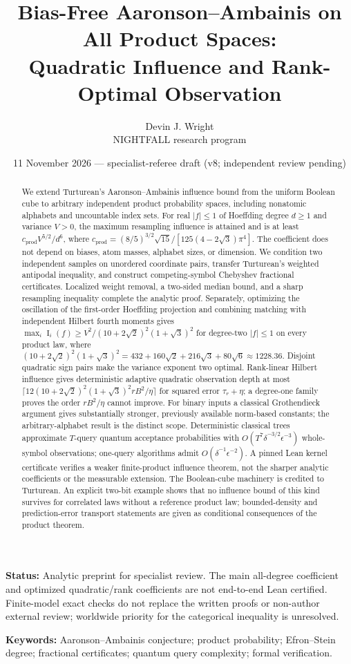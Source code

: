 \documentclass[11pt]{article}
\title{Bias-Free Aaronson--Ambainis on All Product Spaces:\\[2pt]\large Quadratic Influence and Rank-Optimal Observation}
\author{Devin J. Wright\\\small NIGHTFALL research program}
\date{11 November 2026 --- specialist-referee draft (v8; independent review pending)}
\numberwithin{equation}{section}
\theoremstyle{remark}
\newcommand{\Inf}{\operatorname{I}}
\newcommand{\cprod}{c_{\mathrm{prod}}}
\newcommand{\Kquad}{(10+2\sqrt2)^2(1+\sqrt3)^2}
\begin{document}
\maketitle
\begin{abstract}
We extend Turturean's Aaronson--Ambainis influence bound from the uniform Boolean cube to arbitrary independent product probability spaces, including nonatomic alphabets and uncountable index sets. For real $|f|\le1$ of Hoeffding degree $d\ge1$ and variance $V>0$, the maximum resampling influence is attained and is at least $\cprod V^{5/2}/d^6$, where $\cprod=(8/5)^{3/2}\sqrt{15}/[125(4-2\sqrt3)\pi^4]$. The coefficient does not depend on biases, atom masses, alphabet sizes, or dimension. We condition two independent samples on unordered coordinate pairs, transfer Turturean's weighted antipodal inequality, and construct competing-symbol Chebyshev fractional certificates. Localized weight removal, a two-sided median bound, and a sharp resampling inequality complete the analytic proof. Separately, optimizing the oscillation of the first-order Hoeffding projection and combining matching with independent Hilbert fourth moments gives $\max_i\Inf_i(f)\ge V^2/\Kquad$ for degree-two $|f|\le1$ on every product law, where $\Kquad=432+160\sqrt2+216\sqrt3+80\sqrt6\approx1228.36$. Disjoint quadratic sign pairs make the variance exponent two optimal. Rank-linear Hilbert influence gives deterministic adaptive quadratic observation depth at most $\lceil12\Kquad rB^2/\eta\rceil$ for squared error $\tau_r+\eta$; a degree-one family proves the order $rB^2/\eta$ cannot improve. For binary inputs a classical Grothendieck argument gives substantially stronger, previously available norm-based constants; the arbitrary-alphabet result is the distinct scope. Deterministic classical trees approximate $T$-query quantum acceptance probabilities with $O(T^7\delta^{-3/2}\epsilon^{-3})$ whole-symbol observations; one-query algorithms admit $O(\delta^{-1}\epsilon^{-2})$. A pinned Lean kernel certificate verifies a weaker finite-product influence theorem, not the sharper analytic coefficients or the measurable extension. The Boolean-cube machinery is credited to Turturean. An explicit two-bit example shows that no influence bound of this kind survives for correlated laws without a reference product law; bounded-density and prediction-error transport statements are given as conditional consequences of the product theorem.
\end{abstract}
\noindent\textbf{Status:} Analytic preprint for specialist review. The main all-degree coefficient and optimized quadratic/rank coefficients are not end-to-end Lean certified. Finite-model exact checks do not replace the written proofs or non-author external review; worldwide priority for the categorical inequality is unresolved.\par\medskip
\noindent\textbf{Keywords:} Aaronson--Ambainis conjecture; product probability; Efron--Stein degree; fractional certificates; quantum query complexity; formal verification.
\end{document}
